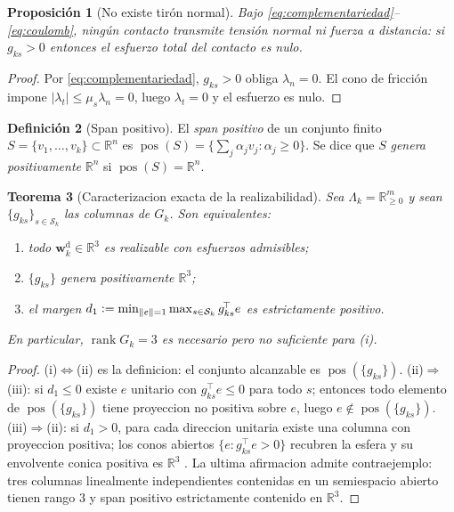 \documentclass[11pt,a4paper]{article}
\theoremstyle{plain}
\newtheorem{teorema}{Teorema}[section]
\newtheorem{proposicion}[teorema]{Proposición}
\theoremstyle{definition}
\newtheorem{definicion}[teorema]{Definición}
\theoremstyle{remark}
\newcommand{\Rb}{\mathbb{R}}
\newcommand{\Scal}{\mathcal{S}}
\newcommand{\Wdem}{\bm{w}^{\mathrm{d}}}
\newcommand{\T}{^{\!\top}}
\newcommand{\defeq}{\vcentcolon=}
\begin{document}
\begin{proposicion}[No existe tirón normal]
\label{pr:notiron}
Bajo \eqref{eq:complementariedad}--\eqref{eq:coulomb}, ningún contacto
transmite tensión normal ni fuerza a distancia: si $g_{ks}>0$ entonces el
esfuerzo total del contacto es nulo.
\end{proposicion}

\begin{proof}
Por \eqref{eq:complementariedad}, $g_{ks}>0$ obliga $\lambda_n=0$. El cono de
fricción impone $|\lambda_t|\le\mu_s\lambda_n=0$, luego $\lambda_t=0$ y el
esfuerzo es nulo.
\end{proof}

\begin{definicion}[Span positivo]
\label{def:span}
El \emph{span positivo} de un conjunto finito $S=\{v_1,\dots,v_k\}\subset\Rb^n$
es $\operatorname{pos}(S)=\{\sum_j\alpha_jv_j:\alpha_j\ge0\}$. Se dice que $S$
\emph{genera positivamente} $\Rb^n$ si $\operatorname{pos}(S)=\Rb^n$.
\end{definicion}

\begin{teorema}[Caracterizacion exacta de la realizabilidad]
\label{th:span}
Sea $\Lambda_k=\Rb_{\ge0}^{m}$ y sean $\{g_{ks}\}_{s\in\Scal_k}$ las columnas de
$G_k$. Son equivalentes:
\begin{enumerate}[label=(\roman*),leftmargin=2.2em,topsep=0.2em,itemsep=0.1em]
  \item todo $\Wdem_k\in\Rb^3$ es realizable con esfuerzos admisibles;
  \item $\{g_{ks}\}$ genera positivamente $\Rb^3$;
  \item el margen $d_1\defeq\min_{\|e\|=1}\max_{s\in\Scal_k} g_{ks}\T e$ es
        estrictamente positivo.
\end{enumerate}
En particular, $\operatorname{rank}G_k=3$ es \emph{necesario pero no
suficiente} para (i).
\end{teorema}

\begin{proof}
(i)$\Leftrightarrow$(ii) es la definicion: el conjunto alcanzable es
$\operatorname{pos}(\{g_{ks}\})$.
(ii)$\Rightarrow$(iii): si $d_1\le0$ existe $e$ unitario con $g_{ks}\T e\le0$
para todo $s$; entonces todo elemento de $\operatorname{pos}(\{g_{ks}\})$ tiene
proyeccion no positiva sobre $e$, luego $e\notin\operatorname{pos}(\{g_{ks}\})$.
(iii)$\Rightarrow$(ii): si $d_1>0$, para cada direccion unitaria existe una
columna con proyeccion positiva; los conos abiertos
$\{e:g_{ks}\T e>0\}$ recubren la esfera y su envolvente conica positiva es
$\Rb^3$ \cite[Def.~1]{lee2026switching}.
La ultima afirmacion admite contraejemplo: tres columnas linealmente
independientes contenidas en un semiespacio abierto tienen rango $3$ y span
positivo estrictamente contenido en $\Rb^3$.
\end{proof}
\end{document}
